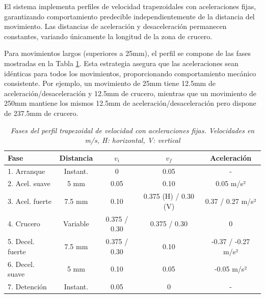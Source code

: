 El sistema implementa perfiles de velocidad trapezoidales con aceleraciones fijas, garantizando comportamiento predecible independientemente de la distancia del movimiento. Las distancias de aceleración y desaceleración permanecen constantes, variando únicamente la longitud de la zona de crucero.

Para movimientos largos (superiores a 25mm), el perfil se compone de las fases mostradas en la Tabla \ref{tab:perfil_trapezoidal}. Esta estrategia asegura que las aceleraciones sean idénticas para todos los movimientos, proporcionando comportamiento mecánico consistente. Por ejemplo, un movimiento de 25mm tiene 12.5mm de aceleración/desaceleración y 12.5mm de crucero, mientras que un movimiento de 250mm mantiene los mismos 12.5mm de aceleración/desaceleración pero dispone de 237.5mm de crucero.

\begin{table}[H]
\centering
\small
\begin{tabular}{|l|c|c|c|c|}
\hline
\textbf{Fase} & \textbf{Distancia} & \textbf{$v_i$} & \textbf{$v_f$} & \textbf{Aceleración} \\
\hline
1. Arranque & Instant. & 0 & 0.05 & - \\
\hline
2. Acel. suave & 5 mm & 0.05 & 0.10 & 0.05 m/s² \\
\hline
3. Acel. fuerte & 7.5 mm & 0.10 & 0.375 (H) / 0.30 (V) & 0.37 / 0.27 m/s² \\
\hline
4. Crucero & Variable & 0.375 / 0.30 & 0.375 / 0.30 & 0 \\
\hline
5. Decel. fuerte & 7.5 mm & 0.375 / 0.30 & 0.10 & -0.37 / -0.27 m/s² \\
\hline
6. Decel. suave & 5 mm & 0.10 & 0.05 & -0.05 m/s² \\
\hline
7. Detención & Instant. & 0.05 & 0 & - \\
\hline
\end{tabular}
\caption{\textit{Fases del perfil trapezoidal de velocidad con aceleraciones fijas. Velocidades en m/s, H: horizontal, V: vertical}}
\label{tab:perfil_trapezoidal}
\end{table}


